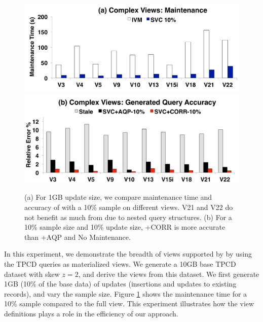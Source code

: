 \begin{figure}[t]
\centering
 \includegraphics[scale=0.14]{exp/msqv_1.pdf}
 \includegraphics[scale=0.14]{exp/msqv_2.pdf}\vspace{-0.5em}
 \caption{(a) For 1GB update size, we compare maintenance time and accuracy of \svc with a 10\% sample on different views. V21 and V22 do not benefit as much from \svc due to nested query structures. (b) For a 10\% sample size and 10\% update size, \svcnospace+CORR is more accurate than \svcnospace+AQP and No Maintenance.\label{exp3-acc}}\vspace{-1.5em}
\end{figure}
In this experiment, we demonstrate the breadth of views supported by \svc by using the TPCD queries as materialized views.
We generate a 10GB base TPCD dataset with skew $z=2$, and derive the views from this dataset.
We first generate 1GB (10\% of the base data) of updates (insertions and updates to existing records), and vary the sample size.
Figure \ref{exp3-acc} shows the maintenance time for a 10\% sample compared to the full view.
This experiment illustrates how the view definitions plays a role in the efficiency of our approach.
